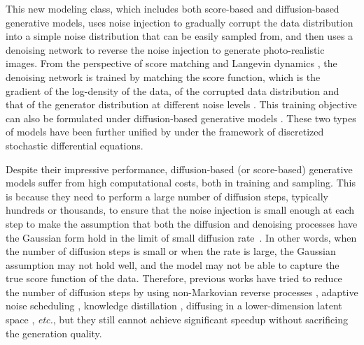 \documentclass{article} \usepackage{iclr2023_conference,times}
\theoremstyle{plain}
\theoremstyle{definition}
\theoremstyle{remark}
\begin{document}
This new modeling class, which includes both  score-based and diffusion-based generative models, uses noise injection to gradually corrupt the data distribution into a simple noise distribution that can be easily sampled from, and then uses a denoising network to reverse the noise injection to generate photo-realistic images.  From the perspective of score matching \citep{hyvarinen2005estimation,vincent2011connection} and Langevin dynamics \citep{neal2011mcmc,welling2011bayesian}, the denoising network is trained by matching the score function, which is the gradient of the log-density of the data, of the corrupted data distribution and that of the generator distribution at different noise levels \citep{scorematching}. This training objective can also be formulated under diffusion-based generative models \citep{diffusion,ddpm}. 
These two types of models
have been further unified by \citet{song2021scorebased} under the framework of discretized stochastic differential equations.





Despite their impressive performance, diffusion-based (or score-based) generative models suffer from high computational costs, both in training and sampling. This is because they need to perform a large number of diffusion steps, typically hundreds or thousands, to ensure that the noise injection is small enough at each step to make the assumption 
that both the diffusion and denoising processes have the Gaussian form  hold in the limit of small diffusion rate~\citep{feller1949theory,diffusion}.
In other words,  when the number of diffusion steps is small or when the rate is large, the Gaussian assumption may not hold well, and the model may not be able to capture the true score function of the data. Therefore, previous works have tried to reduce the number of diffusion steps by using non-Markovian reverse processes \citep{ddim, kong2021fast}, adaptive noise scheduling \citep{san2021noise,kingma2021variational}, knowledge distillation \citep{luhman2021knowledge,salimans2022progressive}, diffusing in a lower-dimension latent space \citep{rombach2022high},  \textit{etc.}, but they still cannot achieve significant speedup without sacrificing the generation quality.
\end{document}
